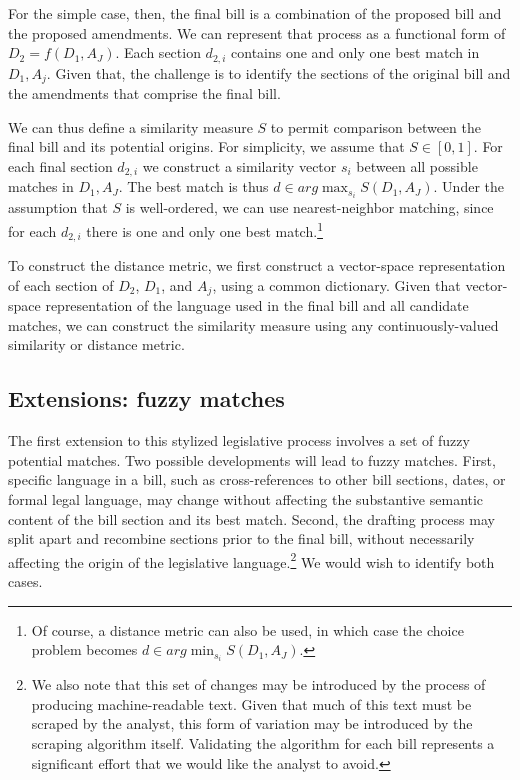 \documentclass[11pt]{article}
\begin{document}
For the simple case, then, the final bill is a
combination of the proposed bill and the proposed
amendments. We can represent that process as a functional form of $D_2
= f(D_1, A_J)$. Each section $d_{2,i}$ contains one and only one best
match in $D_1, A_j$. Given that, the challenge is to identify the sections
of the original bill and the amendments that comprise the final
bill. 

We can thus define a similarity measure $S$ to permit comparison
between the final bill and its potential origins. For simplicity, we
assume that $S \in [0,1]$. For each final section $d_{2,i}$ we
construct a similarity vector $s_i$ between all possible matches in
$D_1, A_J$. The best match is thus $d \in arg \max_{s_i} S(D_1,
A_J)$. Under the assumption that $S$ is well-ordered, we can use
nearest-neighbor matching, since for each $d_{2,i}$ there is one and
only one best match.\footnote{Of course, a distance metric can also be
used, in which case the choice problem becomes $d \in arg \min_{s_i}
S(D_1, A_J)$.}

To construct the distance metric, we first construct a vector-space
representation of each section of $D_2$, $D_1$, and $A_j$, using a
common dictionary. Given that vector-space representation of the
language used in the final bill and all candidate matches, we can
construct the similarity measure using any continuously-valued
similarity or distance metric.

\subsection{Extensions: fuzzy matches}
\label{sec:extens-fuzzy-match}

The first extension to this stylized legislative process involves a
set of fuzzy potential matches. Two possible developments will lead to
fuzzy matches. First, specific language in a bill, such as
cross-references to other bill sections, dates, or formal legal
language, may change without affecting the substantive semantic
content of the bill section and its best match. Second, the drafting
process may split apart and recombine sections prior to the final
bill, without necessarily affecting the origin of the legislative
language.\footnote{We also note that this set of changes may be
  introduced by the process of producing machine-readable text. Given
  that much of this text must be scraped by the analyst, this form of
  variation may be introduced by the scraping algorithm
  itself. Validating the algorithm for each bill represents a
  significant effort that we would like the analyst to avoid.} We would wish to identify both cases.
\end{document}
